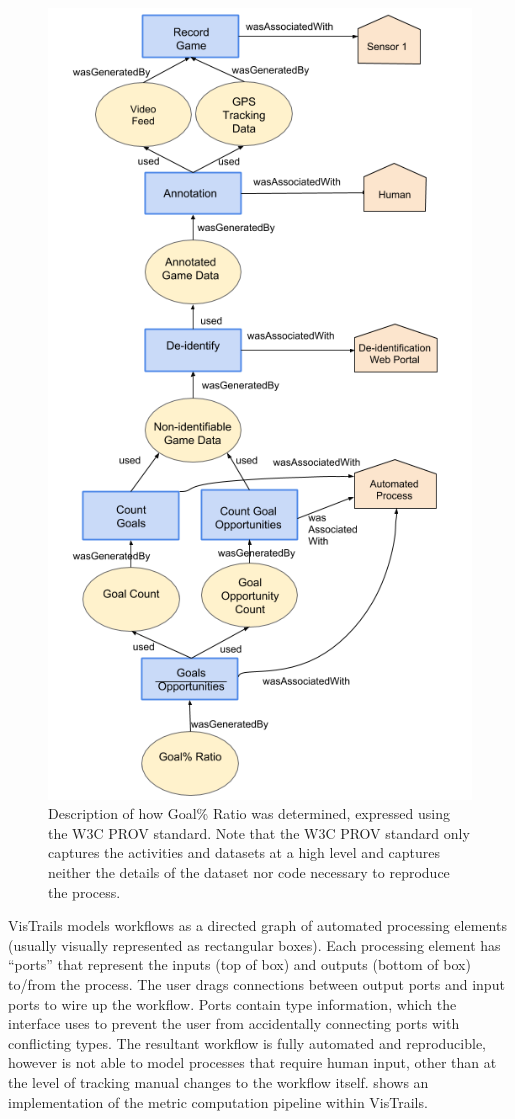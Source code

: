 \begin{figure}[!h]
\centering
\includegraphics[width=0.7\linewidth]{figs/paper/image1.png}
\caption{Description of how Goal\% Ratio was determined,
expressed using the W3C PROV standard. Note that the W3C PROV standard
only captures the activities and datasets at a high level and captures
neither the details of the dataset nor code necessary to reproduce the
process.}
\label{W3CPROV}
\end{figure}

VisTrails models workflows as a directed graph of automated processing
elements (usually visually represented as rectangular boxes). Each
processing element has ``ports'' that represent the inputs (top of box)
and outputs (bottom of box) to/from the process. The user drags
connections between output ports and input ports to wire up the
workflow. Ports contain type information, which the interface uses to
prevent the user from accidentally connecting ports with conflicting
types. The resultant workflow is fully automated and reproducible,
however is not able to model processes that require human input, other
than at the level of tracking manual changes to the workflow itself.
 shows an implementation of the metric computation pipeline within
VisTrails.

